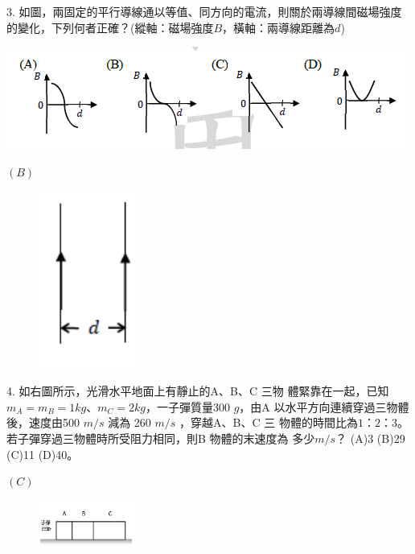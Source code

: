 \documentclass[cn,10pt,math=newtx,chinesefont=founder,device=ig]{elegantbook}
\begin{document}
\begin{example}
   3. 如圖，兩固定的平行導線通以等值、同方向的電流，則關於兩導線間磁場強度的變化，下列何者正確？(縱軸：磁場強度$B$，橫軸：兩導線距離為$d$)
\\
\begin{center}
\includegraphics[scale=1.2]{image/109全國3-1.png}
\end{center}

    \rightline{[全國聯招教甄109]}
\end{example}
\begin{solution}
    $(B)$
\end{solution}
\begin{figure}[htbp]
    \flushright
    \includegraphics[width=0.3\textwidth]{image/109全國3.png}
  \end{figure}
\newpage


\begin{example}
   4. 如右圖所示，光滑水平地面上有靜止的A、B、C 三物
體緊靠在一起，已知$m_A=m_B=1kg、m_C=2kg$，一子彈質量300 $g$，由A 以水平方向連續穿過三物體
後，速度由500 $m/s$ 減為 260 $m/s$ ，穿越A、B、C 三
物體的時間比為$1：2：3$。若子彈穿過三物體時所受阻力相同，則B 物體的末速度為
多少$m/s$？ (A)3 (B)29 (C)11 (D)40。\\
    \rightline{[全國聯招教甄109]}
\end{example}
\begin{solution}
    $(C)$
\end{solution}
\begin{figure}[htbp]
    \flushright
    \includegraphics[width=0.3\textwidth]{image/109全國4.png}
  \end{figure}
\newpage
\end{document}
